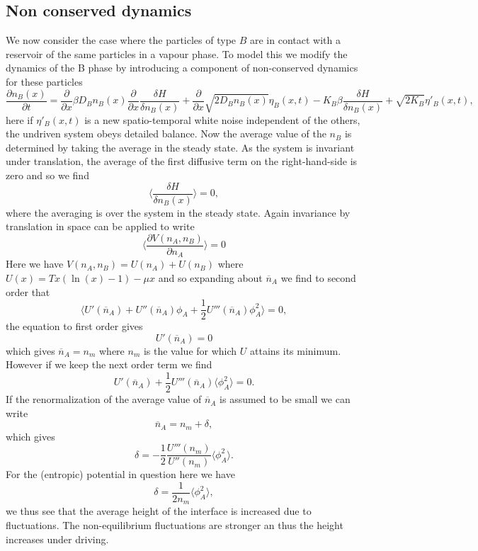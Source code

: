     \subsection{Non conserved dynamics}
We now consider the case where the particles of type $B$ are in contact with 
a reservoir of the same particles in a vapour phase. To model this we modify the dynamics of the B phase by introducing a component of non-conserved dynamics for these particles
\begin{equation}
\frac{\partial n_B(x)}{\partial t} = \frac{\partial}{\partial x} \beta D_B n_B(x)\frac{\partial}{\partial x} \frac{\delta H}{\delta n_B(x)} + \frac{\partial}{\partial x} \sqrt{2D_Bn_B(x)} \eta_B(x,t)
-K_B\beta \frac{\delta H}{\delta n_B(x)} + \sqrt{2K_B}\eta'_B(x,t),
\end{equation}
here if $\eta'_B(x,t)$ is a new spatio-temporal white noise independent of the 
others, the undriven system obeys detailed balance.  Now the average value of the $n_B$ is determined by taking the average in the steady state. As the system is invariant under translation, the average of the first diffusive term on the right-hand-side is zero and so we find
\begin{equation}
\langle \frac{\delta H}{\delta n_B(x)}\rangle=0,
\end{equation}
where the averaging is over the system in the steady state. Again invariance by translation in space can be applied to write
\begin{equation}
\langle \frac{\partial V(n_A,n_B)}{\partial n_A}\rangle  =0
\end{equation}
Here we have $V(n_A,n_B)= U(n_A) + U(n_B)$ where $U(x) = Tx(\ln(x)-1)-\mu x$ and so expanding about $\overline n_A$ we find to second order that 
\begin{equation}
\langle U'(\overline n_A) + U''(\overline n_A)\phi_A +\frac{1}{2}U'''(\overline n_A)\phi_A ^2 \rangle =0,
\end{equation}
the equation to first order gives 
\begin{equation}
U'(\overline n_A)=0
\end{equation}
which gives $\overline n_A= n_m$ where $n_m$ is the value for which $U$ attains its minimum. However if we keep the next order term we find 
\begin{equation}
U'(\overline n_A)+\frac{1}{2} U'''(\overline n_A)\langle\phi_A ^2 \rangle=0.
\end{equation}
If the renormalization of the average value of $\overline n_A$ is assumed to be small we can write
\begin{equation}
\overline n_A= n_m +\delta,
\end{equation}
which gives
\begin{equation}
\delta = -\frac{1}{2} \frac{U'''(n_m)}{U''(n_m)}\langle\phi_A ^2 \rangle.
\end{equation}
For the (entropic) potential in question here we have
\begin{equation}
\delta = \frac{1}{2n_m} \langle\phi_A ^2 \rangle,
\end{equation}
we thus see that the average height of the interface is increased due to fluctuations. The non-equilibrium fluctuations are stronger an thus the height increases under driving. 

              